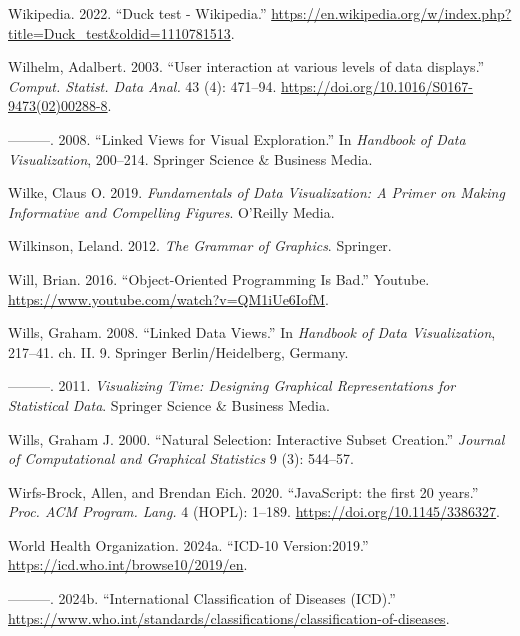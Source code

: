 \documentclass[
]{book}
\newlength{\cslhangindent}
\newenvironment{CSLReferences}[2] %
 {\begin{list}{}{%
  \setlength{\itemindent}{0pt}
  \setlength{\leftmargin}{0pt}
  \setlength{\parsep}{0pt}
  \ifodd #1
   \setlength{\leftmargin}{\cslhangindent}
   \setlength{\itemindent}{-1\cslhangindent}
  \fi
  \setlength{\itemsep}{#2\baselineskip}}}
 {\end{list}}
\theoremstyle{definition}
\theoremstyle{definition}
\theoremstyle{definition}
\theoremstyle{definition}
\theoremstyle{remark}
\begin{document}
\begin{CSLReferences}{1}{0}
Wikipedia. 2022. {``{Duck test - Wikipedia}.''} \url{https://en.wikipedia.org/w/index.php?title=Duck_test&oldid=1110781513}.

Wilhelm, Adalbert. 2003. {``{User interaction at various levels of data displays}.''} \emph{Comput. Statist. Data Anal.} 43 (4): 471--94. \url{https://doi.org/10.1016/S0167-9473(02)00288-8}.

---------. 2008. {``Linked Views for Visual Exploration.''} In \emph{Handbook of Data Visualization}, 200--214. Springer Science \& Business Media.

Wilke, Claus O. 2019. \emph{Fundamentals of Data Visualization: A Primer on Making Informative and Compelling Figures}. O'Reilly Media.

Wilkinson, Leland. 2012. \emph{The Grammar of Graphics}. Springer.

Will, Brian. 2016. {``Object-Oriented Programming Is Bad.''} Youtube. \url{https://www.youtube.com/watch?v=QM1iUe6IofM}.

Wills, Graham. 2008. {``Linked Data Views.''} In \emph{Handbook of Data Visualization}, 217--41. ch. II. 9. Springer Berlin/Heidelberg, Germany.

---------. 2011. \emph{Visualizing Time: Designing Graphical Representations for Statistical Data}. Springer Science \& Business Media.

Wills, Graham J. 2000. {``Natural Selection: Interactive Subset Creation.''} \emph{Journal of Computational and Graphical Statistics} 9 (3): 544--57.

Wirfs-Brock, Allen, and Brendan Eich. 2020. {``{JavaScript: the first 20 years}.''} \emph{Proc. ACM Program. Lang.} 4 (HOPL): 1--189. \url{https://doi.org/10.1145/3386327}.

World Health Organization. 2024a. {``{ICD-10 Version:2019}.''} \url{https://icd.who.int/browse10/2019/en}.

---------. 2024b. {``{International Classification of Diseases (ICD)}.''} \url{https://www.who.int/standards/classifications/classification-of-diseases}.


\end{CSLReferences}
\end{document}
